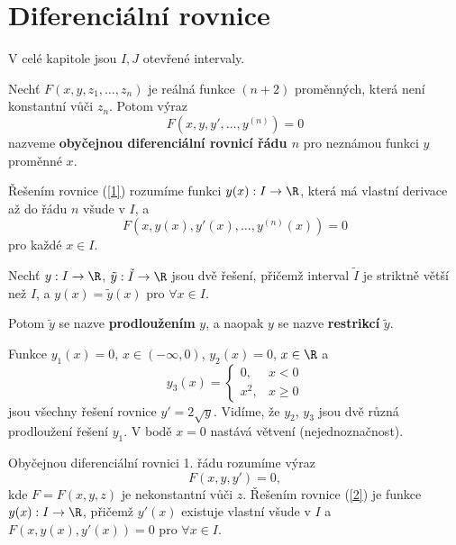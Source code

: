 \section{Diferenciální rovnice}

\begin{poznamka}
  V celé kapitole jsou $I, J$ otevřené intervaly.
\end{poznamka}

\begin{definice}
Nechť $F(x, y, z_1, \ldots, z_n)$ je reálná funkce $(n + 2)$ proměnných, která není konstantní vůči $z_n$. Potom výraz
\begin{equation}\label{1}
F(x, y, y', \dots, y^{(n)}) = 0
\end{equation}
nazveme \textbf{obyčejnou diferenciální rovnicí řádu $n$} pro neznámou funkci $y$ proměnné $x$.

Řešením rovnice (\ref{1}) rozumíme funkci $y(x): I \to \R$, která má vlastní derivace až do řádu $n$ všude v $I$, a
\[
F(x, y(x), y'(x), \dots, y^{(n)}(x)) = 0
\]
pro každé $x \in I$.
\end{definice}

\begin{definice}
Nechť $y: I \to \R$, $\tilde{y}: \tilde{I} \to \R$ jsou dvě řešení, přičemž interval $\tilde{I}$ je striktně větší než $I$, a $y(x) = \tilde{y}(x)$ pro $\forall x \in I$.

Potom $\tilde{y}$ se nazve \textbf{prodloužením} $y$, a naopak $y$ se nazve \textbf{restrikcí} $\tilde{y}$.
\end{definice}

\begin{priklad}
Funkce $y_1(x) = 0$, $x \in (-\infty, 0)$, $y_2(x) = 0$, $x \in \R$ a
\[
y_3(x) = \begin{cases}
0, & x < 0 \\
x^2, & x \geq 0
\end{cases}
\]
jsou všechny řešení rovnice $y' = 2\sqrt{y}$. Vidíme, že $y_2$, $y_3$ jsou dvě různá prodloužení řešení $y_1$. V bodě $x = 0$ nastává větvení (nejednoznačnost).
\end{priklad}

\begin{definice}
Obyčejnou diferenciální rovnici 1. řádu rozumíme výraz
\begin{equation}\label{2}
F(x, y, y') = 0,
\end{equation}
kde $F = F(x, y, z)$ je nekonstantní vůči $z$. Řešením rovnice (\ref{2}) je funkce $y(x): I \to \R$, přičemž $y'(x)$ existuje vlastní všude v $I$ a $F(x, y(x), y'(x)) = 0$ pro $\forall x \in I$.
\end{definice}


